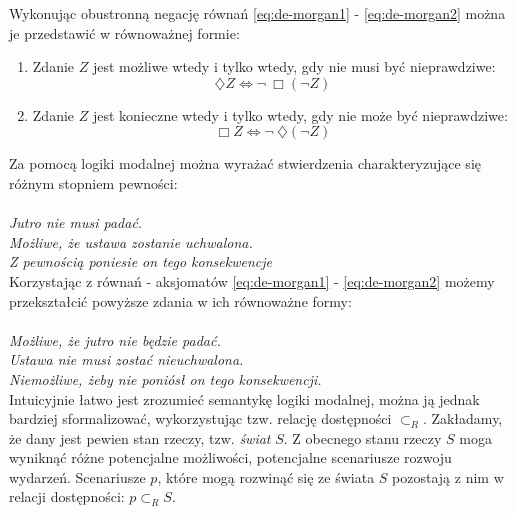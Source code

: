 \documentclass{article}
\begin{document}
Wykonując obustronną negację równań \ref{eq:de-morgan1} - \ref{eq:de-morgan2} można je przedstawić w równoważnej formie: 

\begin{enumerate}
	\item Zdanie $Z$ jest możliwe wtedy i tylko wtedy, gdy nie musi być nieprawdziwe:
	\begin{equation}
	\diamondsuit Z \Leftrightarrow \neg \ \Box \left( \neg Z \right)
	\end{equation}
	\item Zdanie $Z$ jest konieczne wtedy i tylko wtedy, gdy nie może być nieprawdziwe:
	\begin{equation}
	\Box Z \Leftrightarrow \neg \ \diamondsuit \left( \neg Z \right)
	\end{equation}
\end{enumerate}

Za pomocą logiki modalnej można wyrażać stwierdzenia charakteryzujące się różnym stopniem pewności: \\ \\ 
\emph{Jutro nie musi padać. } \\ 
\emph{Możliwe, że ustawa zostanie uchwalona. } \\ 
\emph{Z pewnością poniesie on tego konsekwencje} \\ 

Korzystając z równań - aksjomatów \ref{eq:de-morgan1} - \ref{eq:de-morgan2} możemy przekształcić powyższe zdania w ich równoważne formy: \\ \\ 
\emph{Możliwe, że jutro nie będzie padać. } \\ 
\emph{Ustawa nie musi zostać nieuchwalona. } \\ 
\emph{Niemożliwe, żeby nie poniósł on tego konsekwencji. } \\ 

Intuicyjnie łatwo jest zrozumieć semantykę logiki modalnej, można ją jednak bardziej sformalizować, wykorzystując tzw. relację dostępności $\subset_R$. Zakładamy, że dany jest pewien stan rzeczy, tzw. \emph{świat} $S$. Z obecnego stanu rzeczy $S$ moga wyniknąć różne potencjalne możliwości, potencjalne scenariusze rozwoju wydarzeń. Scenariusze $p$, które mogą rozwinąć się ze świata $S$ pozostają z nim w relacji dostępności: $p \subset_R S$. 
\end{document}
